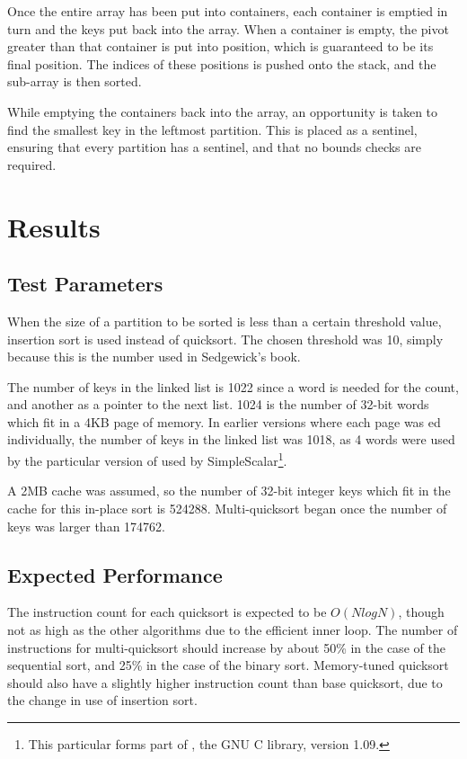 Once the entire array has been put into containers, each container is emptied
in turn and the keys put back into the array. When a container is empty, the
pivot greater than that container is put into position, which is guaranteed to
be its final position. The indices of these positions is pushed onto the
stack, and the sub-array is then sorted.

While emptying the containers back into the array, an opportunity is taken to
find the smallest key in the leftmost partition. This is placed as a sentinel,
ensuring that every partition has a sentinel, and that no bounds checks are
required.

\section{Results}

\subsection{Test Parameters}

When the size of a partition to be sorted is less than a certain
threshold value, insertion sort is used instead of quicksort. The
chosen threshold was 10, simply because this is the number used in
Sedgewick's book.

The number of keys in the linked list is 1022 since a word is needed for the
count, and another as a pointer to the next list. 1024 is the number of 32-bit
words which fit in a 4KB page of memory. In earlier versions where each page was
ed individually, the number of keys in the linked list was 1018,
as 4 words were used by the particular version of  used by
SimpleScalar\footnote{This particular  forms part of
, the GNU C library, version 1.09.}.

A 2MB cache was assumed, so the number of 32-bit integer keys which fit in the
cache for this in-place sort is 524288. Multi-quicksort began once the number
of keys was larger than 174762.

\subsection{Expected Performance}

The instruction count for each quicksort is expected to be $O(NlogN)$, though
not as high as the other algorithms due to the efficient inner loop. The number
of instructions for multi-quicksort should increase by about 50\% in the case of
the sequential sort, and 25\% in the case of the binary sort. Memory-tuned
quicksort should also have a slightly higher instruction count than base
quicksort, due to the change in use of insertion sort.

